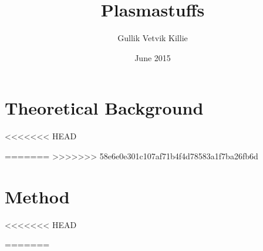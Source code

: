 \documentclass[x11names,twoside,english]{uiofysmaster}
\author{Gullik Vetvik Killie}
\title{Plasmastuffs}
\date{June 2015}
\begin{document}
% 
%
\tableofcontents
% 
%     

%     
%
\chapter{Theoretical Background}
    
<<<<<<< HEAD
    
=======
%     
>>>>>>> 58e6e0e301c107af71b4f4d78583a1f7ba26fb6d
%     
%     
%     
%     
%     
%     
\chapter{Method}
%     
%     
      
%     
%     
%     
%     
%     
%
%     
%     
%     
%     
<<<<<<< HEAD

%     
    
=======
%
\end{document}
